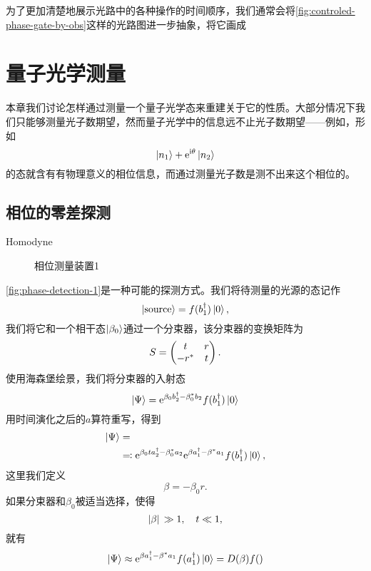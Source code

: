 为了更加清楚地展示光路中的各种操作的时间顺序，我们通常会将\autoref{fig:controled-phase-gate-by-obs}这样的光路图进一步抽象，将它画成

\chapter{量子光学测量}

本章我们讨论怎样通过测量一个量子光学态来重建关于它的性质。大部分情况下我们只能够测量光子数期望，然而量子光学中的信息远不止光子数期望——例如，形如
\[
    \ket{n_1} + \mathrm{e}^{\mathrm{i} \theta} \ket{n_2}
\]
的态就含有有物理意义的相位信息，而通过测量光子数是测不出来这个相位的。

\section{相位的零差探测}

Homodyne

\begin{figure}
    \centering
    
    \caption{相位测量装置1}
    \label{fig:phase-detection-1}
\end{figure}

\autoref{fig:phase-detection-1}是一种可能的探测方式。我们将待测量的光源的态记作
\begin{equation}
    \ket{\text{source}} = f(b_1^\dagger) \ket{0},
\end{equation}
我们将它和一个相干态$\ket{\beta_0}$通过一个分束器，该分束器的变换矩阵为
\begin{equation}
    S = \pmqty{ t & r \\ -r^* & t }.
\end{equation}
使用海森堡绘景，我们将分束器的入射态
\[
    \ket{\Psi} = \mathrm{e}^{\beta_0 b_2^\dagger - \beta_0^* b_2} f(b_1^\dagger) \ket{0}
\] 
用时间演化之后的$a$算符重写，得到
\begin{equation}
    \begin{aligned}
        \ket{\Psi} &= \\
        &\eqqcolon \mathrm{e}^{\beta_0 t a_2^\dagger - \beta_0^* a_2} \mathrm{e}^{\beta a_1^\dagger - \beta^* a_1} f(b_1^\dagger) \ket{0},
    \end{aligned}
\end{equation}
这里我们定义
\begin{equation}
    \beta = - \beta_0 r.
\end{equation}
如果分束器和$\beta_0$被适当选择，使得
\begin{equation}
    \abs*{\beta} \gg 1, \quad t \ll 1,
\end{equation}
就有
\begin{equation}
    \ket{\Psi} \approx \mathrm{e}^{\beta a_1^\dagger - \beta^* a_1} f( a_1^\dagger) \ket{0} = D(\beta) f()
\end{equation}

